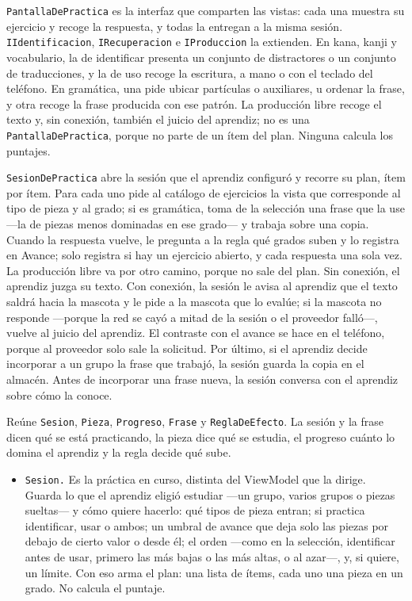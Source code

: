 \documentclass[11pt]{article}
\begin{document}
\begin{description}
  \raggedright
  \item[Vista.] \texttt{PantallaDePractica} es la interfaz que comparten las vistas: cada una muestra su ejercicio y recoge la respuesta, y todas la entregan a la misma sesión. \texttt{IIdentificacion}, \texttt{IRecuperacion} e \texttt{IProduccion} la extienden. En kana, kanji y vocabulario, la de identificar presenta un conjunto de distractores o un conjunto de traducciones, y la de uso recoge la escritura, a mano o con el teclado del teléfono. En gramática, una pide ubicar partículas o auxiliares, u ordenar la frase, y otra recoge la frase producida con ese patrón. La producción libre recoge el texto y, sin conexión, también el juicio del aprendiz; no es una \texttt{PantallaDePractica}, porque no parte de un ítem del plan. Ninguna calcula los puntajes.
  \item[ViewModel.] \texttt{SesionDePractica} abre la sesión que el aprendiz configuró y recorre su plan, ítem por ítem. Para cada uno pide al catálogo de ejercicios la vista que corresponde al tipo de pieza y al grado; si es gramática, toma de la selección una frase que la use ---la de piezas menos dominadas en ese grado--- y trabaja sobre una copia. Cuando la respuesta vuelve, le pregunta a la regla qué grados suben y lo registra en Avance; solo registra si hay un ejercicio abierto, y cada respuesta una sola vez. La producción libre va por otro camino, porque no sale del plan. Sin conexión, el aprendiz juzga su texto. Con conexión, la sesión le avisa al aprendiz que el texto saldrá hacia la mascota y le pide a la mascota que lo evalúe; si la mascota no responde ---porque la red se cayó a mitad de la sesión o el proveedor falló---, vuelve al juicio del aprendiz. El contraste con el avance se hace en el teléfono, porque al proveedor solo sale la solicitud. Por último, si el aprendiz decide incorporar a un grupo la frase que trabajó, la sesión guarda la copia en el almacén. Antes de incorporar una frase nueva, la sesión conversa con el aprendiz sobre cómo la conoce.
  \item[Modelo.] Reúne \texttt{Sesion}, \texttt{Pieza}, \texttt{Progreso}, \texttt{Frase} y \texttt{ReglaDeEfecto}. La sesión y la frase dicen qué se está practicando, la pieza dice qué se estudia, el progreso cuánto lo domina el aprendiz y la regla decide qué sube.
  \begin{itemize}
    \raggedright
    \item \texttt{Sesion.} Es la práctica en curso, distinta del ViewModel que la dirige. Guarda lo que el aprendiz eligió estudiar ---un grupo, varios grupos o piezas sueltas--- y cómo quiere hacerlo: qué tipos de pieza entran; si practica identificar, usar o ambos; un umbral de avance que deja solo las piezas por debajo de cierto valor o desde él; el orden ---como en la selección, identificar antes de usar, primero las más bajas o las más altas, o al azar---, y, si quiere, un límite. Con eso arma el plan: una lista de ítems, cada uno una pieza en un grado. No calcula el puntaje.

\end{itemize}
\end{description}
\end{document}
